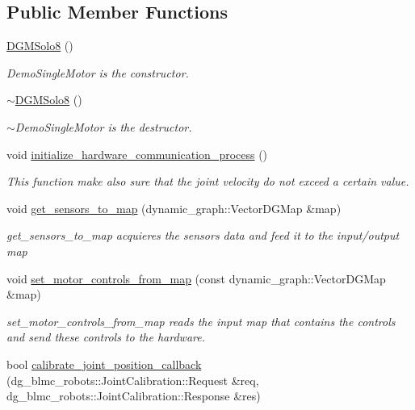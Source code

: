 \subsection*{Public Member Functions}
\begin{DoxyCompactItemize}
\item 
\hyperlink{classdg__blmc__robots_1_1DGMSolo8_ac60de8a48c9fcf7d1f769dab90753e2b}{D\+G\+M\+Solo8} ()\hypertarget{classdg__blmc__robots_1_1DGMSolo8_ac60de8a48c9fcf7d1f769dab90753e2b}{}\label{classdg__blmc__robots_1_1DGMSolo8_ac60de8a48c9fcf7d1f769dab90753e2b}

\begin{DoxyCompactList}\small\item\em Demo\+Single\+Motor is the constructor. \end{DoxyCompactList}\item 
\hyperlink{classdg__blmc__robots_1_1DGMSolo8_a260d27a6376606bc72e07caf445435d2}{$\sim$\+D\+G\+M\+Solo8} ()\hypertarget{classdg__blmc__robots_1_1DGMSolo8_a260d27a6376606bc72e07caf445435d2}{}\label{classdg__blmc__robots_1_1DGMSolo8_a260d27a6376606bc72e07caf445435d2}

\begin{DoxyCompactList}\small\item\em $\sim$\+Demo\+Single\+Motor is the destructor. \end{DoxyCompactList}\item 
void \hyperlink{classdg__blmc__robots_1_1DGMSolo8_ac2d419f12dd51ea7cf5b429f766e21c2}{initialize\+\_\+hardware\+\_\+communication\+\_\+process} ()
\begin{DoxyCompactList}\small\item\em This function make also sure that the joint velocity do not exceed a certain value. \end{DoxyCompactList}\item 
void \hyperlink{classdg__blmc__robots_1_1DGMSolo8_a5c024946d27b7b52b3b6cc568efe96df}{get\+\_\+sensors\+\_\+to\+\_\+map} (dynamic\+\_\+graph\+::\+Vector\+D\+G\+Map \&map)
\begin{DoxyCompactList}\small\item\em get\+\_\+sensors\+\_\+to\+\_\+map acquieres the sensors data and feed it to the input/output map \end{DoxyCompactList}\item 
void \hyperlink{classdg__blmc__robots_1_1DGMSolo8_a7b6f7771158eada4f93cf5d156fbe9a9}{set\+\_\+motor\+\_\+controls\+\_\+from\+\_\+map} (const dynamic\+\_\+graph\+::\+Vector\+D\+G\+Map \&map)
\begin{DoxyCompactList}\small\item\em set\+\_\+motor\+\_\+controls\+\_\+from\+\_\+map reads the input map that contains the controls and send these controls to the hardware. \end{DoxyCompactList}\item 
bool \hyperlink{classdg__blmc__robots_1_1DGMSolo8_add051134152340a82e5466e186d15c0e}{calibrate\+\_\+joint\+\_\+position\+\_\+callback} (dg\+\_\+blmc\+\_\+robots\+::\+Joint\+Calibration\+::\+Request \&req, dg\+\_\+blmc\+\_\+robots\+::\+Joint\+Calibration\+::\+Response \&res)
\end{DoxyCompactItemize}

